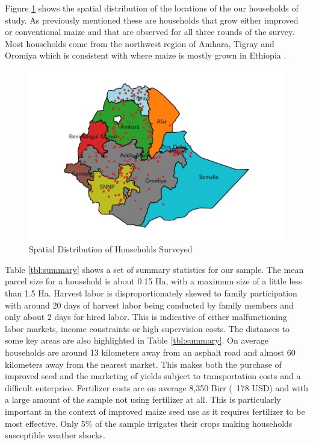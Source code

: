 \documentclass{article}
\begin{document}
Figure \ref{map:regions} shows the spatial distribution of the locations of the our households of study. As previously mentioned these are households that grow either improved or conventional maize and that are observed for all three rounds of the survey. Most households come from the northwest region of Amhara, Tigray and Oromiya which is consistent with where maize is mostly grown in Ethiopia \citep{Abate2015-rj}.

\begin{figure}
    \centering
    \includegraphics{results/figures/map_hhids.pdf}
    \caption{Spatial Distribution of Households Surveyed}
    \label{map:regions}
\end{figure}

Table \ref{tbl:summary} shows a set of summary statistics for our sample. The mean parcel size for a household is about 0.15 Ha, with a maximum size of a little less than 1.5 Ha. Harvest labor is disproportionately skewed to family participation with around 20 days of harvest labor being conducted by family members and only about 2 days for hired labor. This is indicative of either malfunctioning labor markets, income constraints or high supervision costs. The distances to some key areas are also highlighted in Table \ref{tbl:summary}. On average households are around 13 kilometers away from an asphalt road and almost 60 kilometers away from the nearest market. This makes both the purchase of improved seed and the marketing of yields subject to transportation costs and a difficult enterprise. Fertilizer costs are on average 8,350 Birr (~178 USD) and with a large amount of the sample not using fertilizer at all. This is particularly important in the context of improved maize seed use as it requires fertilizer to be most effective. Only 5\% of the sample irrigates their crops making households susceptible weather shocks.
\end{document}
